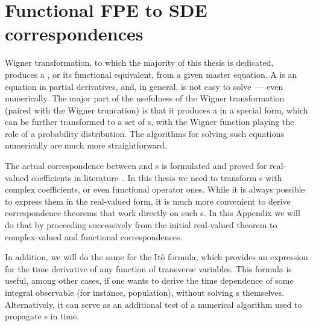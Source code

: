 \chapter{Functional FPE to SDE correspondences}
\label{cha:appendix:fpe-sde}

Wigner transformation, to which the majority of this thesis is dedicated, produces a , or its functional equivalent, from a given master equation.
A  is an equation in partial derivatives, and, in general, is not easy to solve~--- even numerically.
The major part of the usefulness of the Wigner transformation (paired with the Wigner truncation) is that it produces a  in a special form, which can be further transformed to a set of s, with the Wigner function playing the role of a probability distribution.
The algorithms for solving such equations numerically are much more straightforward.

The actual correspondence between  and s is formulated and proved for real-valued coefficients in literature~\cite{Risken1996}.
In this thesis we need to transform s with complex coefficients, or even functional operator ones.
While it is always possible to express them in the real-valued form, it is much more convenient to derive correspondence theorems that work directly on such s.
In this Appendix we will do that by proceeding successively from the initial real-valued theorem to complex-valued and functional correspondences.

In addition, we will do the same for the It\^o formula, which provides an expression for the time derivative of any function of transverse variables.
This formula is useful, among other cases, if one wants to derive the time dependence of some integral observable (for instance, population), without solving s themselves.
Alternatively, it can serve as an additional test of a numerical algorithm used to propagate s in time.



